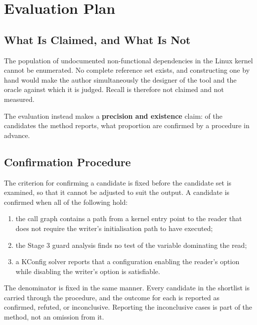 \documentclass[12pt, a4paper, oneside]{book}
\begin{document}
\chapter{Evaluation Plan}
\label{sec:eval}

\section{What Is Claimed, and What Is Not}

The population of undocumented non-functional dependencies in the Linux kernel
cannot be enumerated. No complete reference set exists, and constructing one by
hand would make the author simultaneously the designer of the tool and the oracle
against which it is judged. Recall is therefore not claimed and not measured.

The evaluation instead makes a \textbf{precision and existence} claim: of the
candidates the method reports, what proportion are confirmed by a procedure in advance. 

\section{Confirmation Procedure}

The criterion for confirming a candidate is fixed before the candidate set is
examined, so that it cannot be adjusted to suit the output. A candidate is
confirmed when all of the following hold:

\begin{enumerate}[leftmargin=*, label=\textbf{C\arabic*.}]
  \item the call graph contains a path from a kernel entry point to the reader
        that does not require the writer's initialisation path to have executed;
  \item the Stage 3 guard analysis finds no test of the variable dominating the
        read;
  \item a KConfig solver reports that a configuration enabling the reader's
        option while disabling the writer's option is satisfiable.
\end{enumerate}

The denominator is fixed in the same manner. Every candidate in the shortlist is carried through the procedure, and
the outcome for each is reported as confirmed, refuted, or inconclusive.
Reporting the inconclusive cases is part of the method, not an omission from it.
\end{document}
